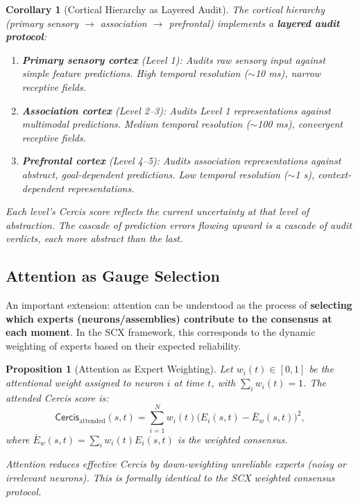 \documentclass[12pt,a4paper]{article}
\newtheorem{proposition}[theorem]{Proposition}
\newtheorem{corollary}[theorem]{Corollary}
\theoremstyle{remark}
\newcommand{\Cercis}{\textsf{Cercis}}
\begin{document}
\begin{corollary}[Cortical Hierarchy as Layered Audit]\label{cor:cortical-audit}
The cortical hierarchy (primary sensory $\to$ association $\to$ prefrontal)
implements a \textbf{layered audit protocol}:

\begin{enumerate}[label=(\roman*)]
    \item \textbf{Primary sensory cortex} (Level 1): Audits raw sensory input against simple feature predictions. High temporal resolution ($\sim$10 ms), narrow receptive fields.
    \item \textbf{Association cortex} (Level 2--3): Audits Level 1 representations against multimodal predictions. Medium temporal resolution ($\sim$100 ms), convergent receptive fields.
    \item \textbf{Prefrontal cortex} (Level 4--5): Audits association representations against abstract, goal-dependent predictions. Low temporal resolution ($\sim$1 s), context-dependent representations.
\end{enumerate}

Each level's \Cercis{} score reflects the current uncertainty at that level
of abstraction. The cascade of prediction errors flowing upward is a cascade
of audit verdicts, each more abstract than the last.
\end{corollary}

\subsection{Attention as Gauge Selection}

An important extension: attention can be understood as the process of
\textbf{selecting which experts (neurons/assemblies) contribute to the
consensus at each moment}. In the SCX framework, this corresponds to the
dynamic weighting of experts based on their expected reliability.

\begin{proposition}[Attention as Expert Weighting]\label{prop:attention}
Let $w_i(t) \in [0, 1]$ be the attentional weight assigned to neuron $i$ at
time $t$, with $\sum_i w_i(t) = 1$. The attended \Cercis{} score is:
\begin{equation}\label{eq:attended-cercis}
    \Cercis_{\text{attended}}(s, t) = \sum_{i=1}^{N} w_i(t) \big(E_i(s, t) - \bar{E}_w(s, t)\big)^2,
\end{equation}
where $\bar{E}_w(s, t) = \sum_i w_i(t) E_i(s, t)$ is the weighted consensus.

Attention reduces effective \Cercis{} by down-weighting unreliable experts
(noisy or irrelevant neurons). This is formally identical to the SCX weighted
consensus protocol.
\end{proposition}
\end{document}
